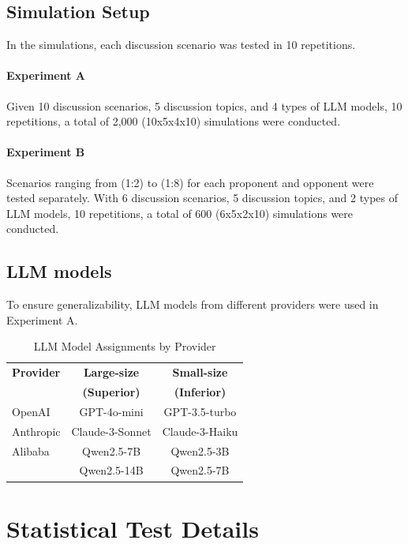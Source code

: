 \documentclass[11pt]{article}
\begin{document}
\subsection{Simulation Setup}

In the simulations, each discussion scenario was tested in 10 repetitions.

\paragraph{Experiment A} 
Given 10 discussion scenarios, 5 discussion topics, and 4 types of LLM models, 10 repetitions, a total of 2,000 (10x5x4x10) simulations were conducted.

\paragraph{Experiment B} 
Scenarios ranging from (1:2) to (1:8) for each proponent and opponent were tested separately. With 6 discussion scenarios, 5 discussion topics, and 2 types of LLM models, 10 repetitions, a total of 600 (6x5x2x10) simulations were conducted.


\subsection{LLM models}
To ensure generalizability, LLM models from different providers were used in Experiment A.

\begin{table}[ht]
\centering
\caption{LLM Model Assignments by Provider}
\label{tab:llm_models}
\renewcommand{\arraystretch}{1.2}
\begin{tabular}{l|cc}
\toprule
\textbf{Provider} & \textbf{Large-size} & \textbf{Small-size} \\
& \textbf{(Superior)} & \textbf{(Inferior)} \\
\hline
OpenAI     & GPT-4o-mini  & GPT-3.5-turbo \\
Anthropic  & Claude-3-Sonnet      & Claude-3-Haiku \\
Alibaba & Qwen2.5-7B & Qwen2.5-3B \\
 & Qwen2.5-14B & Qwen2.5-7B \\
\bottomrule
\end{tabular}
\end{table}

\section{Statistical Test Details}
\label{sec:appendix_stat}
\end{document}
